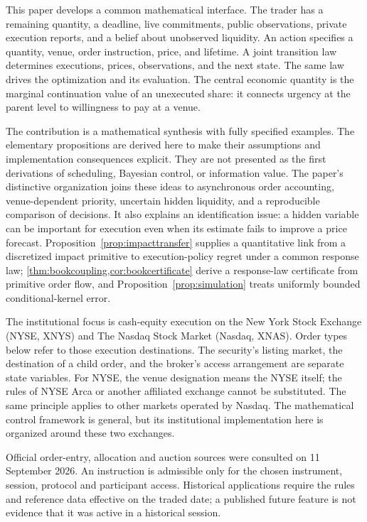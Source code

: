 \documentclass[11pt]{article}
\numberwithin{equation}{section}
\theoremstyle{definition}
\theoremstyle{remark}
\theoremstyle{definition}
\begin{document}
This paper develops a common mathematical interface. The trader has a remaining
quantity, a deadline, live commitments, public observations, private execution
reports, and a belief about unobserved liquidity. An action specifies a quantity,
venue, order instruction, price, and lifetime. A joint transition law determines
executions, prices, observations, and the next state. The same law drives the
optimization and its evaluation. The central economic quantity is the marginal
continuation value of an unexecuted share: it connects urgency at the parent
level to willingness to pay at a venue.

The contribution is a mathematical synthesis with fully specified examples.
The elementary propositions are derived here to make their assumptions and
implementation consequences explicit. They are not presented as the first
derivations of scheduling, Bayesian control, or information value. The paper's
distinctive organization joins these ideas to asynchronous order accounting,
venue-dependent priority, uncertain hidden liquidity, and a reproducible
comparison of decisions. It also explains an identification issue: a hidden
variable can be important for execution even when its estimate fails to improve
a price forecast. Proposition~\ref{prop:impacttransfer} supplies a quantitative
link from a discretized impact primitive to execution-policy regret under a
common response law; \cref{thm:bookcoupling,cor:bookcertificate} derive a
response-law certificate from primitive order flow, and
Proposition~\ref{prop:simulation} treats uniformly bounded conditional-kernel error.

The institutional focus is cash-equity execution on the New York Stock Exchange
(NYSE, XNYS) and The Nasdaq Stock Market (Nasdaq, XNAS). Order types below refer
to those execution destinations. The security's listing market, the destination
of a child order, and the broker's access arrangement are separate state
variables. For NYSE, the venue designation means the NYSE itself; the rules of
NYSE Arca or another affiliated exchange cannot be substituted. The same
principle applies to other markets operated by Nasdaq. The mathematical control
framework is general, but its institutional implementation here is organized
around these two exchanges.

Official order-entry, allocation and auction sources were consulted on
11 September 2026. An instruction is admissible only for the chosen instrument,
session, protocol and participant access. Historical applications require the
rules and reference data effective on the traded date; a published future
feature is not evidence that it was active in a historical session.
\end{document}
